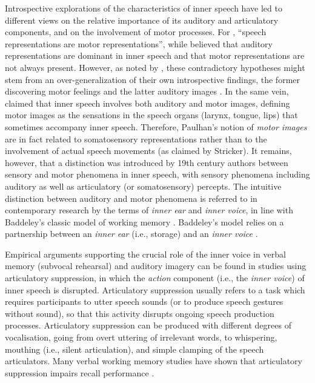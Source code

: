 \documentclass[12pt,]{book}
\theoremstyle{definition}
\theoremstyle{definition}
\theoremstyle{definition}
\theoremstyle{remark}
\begin{document}
Introspective explorations of the characteristics of inner speech have
led to different views on the relative importance of its auditory and
articulatory components, and on the involvement of motor processes. For
\citet{Stricker1880}, ``speech representations are motor
representations'', while \citet{Egger1881} believed that auditory
representations are dominant in inner speech and that motor
representations are not always present. However, as noted by
\citet{Ballet1886}, these contradictory hypotheses might stem from an
over-generalization of their own introspective findings, the former
discovering motor feelings and the latter auditory images
\citep{Ballet1886}. In the same vein, \citet{Paulhan1886} claimed that
inner speech involves both auditory and motor images, defining motor
images as the sensations in the speech organs (larynx, tongue, lips)
that sometimes accompany inner speech. Therefore, Paulhan's notion of
\emph{motor images} are in fact related to somatosensory representations
rather than to the involvement of actual speech movements (as claimed by
Stricker). It remains, however, that a distinction was introduced by
19th century authors between sensory and motor phenomena in inner
speech, with sensory phenomena including auditory as well as
articulatory (or somatosensory) percepts. The intuitive distinction
between auditory and motor phenomena is referred to in contemporary
research by the terms of \emph{inner ear} and \emph{inner voice}, in
line with Baddeley's classic model of working memory
\citetext{\citealp[e.g.,][]{Baddeley1974}; \citealp[see
also][]{Buchsbaum2013}}. Baddeley's model relies on a partnership
between an \emph{inner ear} (i.e., storage) and an \emph{inner voice}
\citep[i.e., subvocal rehearsal; see][]{Smith1995}.

Empirical arguments supporting the crucial role of the inner voice in
verbal memory (subvocal rehearsal) and auditory imagery can be found in
studies using articulatory suppression, in which the \emph{action}
component (i.e., the \emph{inner voice}) of inner speech is disrupted.
Articulatory suppression usually refers to a task which requires
participants to utter speech sounds (or to produce speech gestures
without sound), so that this activity disrupts ongoing speech production
processes. Articulatory suppression can be produced with different
degrees of vocalisation, going from overt uttering of irrelevant words,
to whispering, mouthing (i.e., silent articulation), and simple clamping
of the speech articulators. Many verbal working memory studies have
shown that articulatory suppression impairs recall performance
\citep[e.g.,][]{Baddeley1984}.
\end{document}
